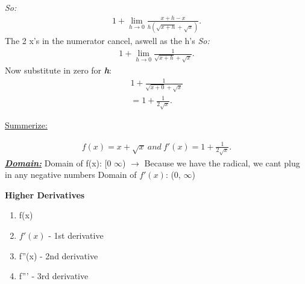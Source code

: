 \documentclass{report}
\begin{document}
        \bigbreak \noindent 
        \textit{So:}
        \begin{align*}
            1 + \lim\limits_{h \to 0}{ \frac{x+h-x}{h( \sqrt{x+h} + \sqrt{x})}}
        .\end{align*}
        \bigbreak \noindent 
        The 2 x's in the numerator cancel, aswell as the h's
        \bigbreak \noindent 
        \textit{So:}
        \begin{align*}
            1 + \lim\limits_{h \to 0}{ \frac{1}{ \sqrt{x+h} + \sqrt{x}}}
        .\end{align*}
        \bigbreak \noindent 
        Now substitute in zero for \textbf{\textit{h}}:
        \begin{align*}
            1 + \frac{1}{ \sqrt{x + 0} + \sqrt{x}} \\ 
            = 1 + \frac{1}{2 \sqrt{x}}
        .\end{align*}
        \bigbreak \noindent \bigbreak \noindent 
        \begin{mdframed}
            \underline{Summerize:}
        \end{mdframed}
        \begin{align*}
            f(x) = x + \sqrt{x}\ and\ f\prime(x) = 1 + \frac{1}{2 \sqrt{x}}
        .\end{align*} 
        \bigbreak \noindent 
        \textbf{\textit{\underline{Domain:}}}
        \bigbreak \noindent 
        Domain of f(x): [0 $\infty$) $\rightarrow$ Because we have the radical, we cant plug in any negative numbers 
        \bigbreak \noindent 
        Domain of $f\prime(x)$: (0, $\infty$) 

        \bigbreak \noindent 

        \bigbreak \noindent \bigbreak \noindent 

        \bigbreak \noindent 

        \bigbreak \noindent \bigbreak \noindent 
        \begin{large}
            \textbf{Higher Derivatives}
        \end{large}
        \begin{enumerate}
            \item f(x)
            \item $f\prime(x)$ - 1st derivative
            \item f''(x) - 2nd derivative
            \item f''' - 3rd derivative
        \end{enumerate}
\end{document}
